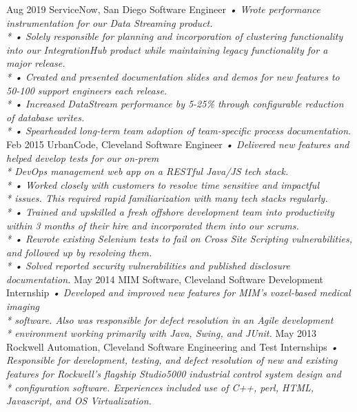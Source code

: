 \documentclass[]{friggeri-cv}
\begin{document}
\begin{entrylist}
  \entry
    {Aug 2019}
    {ServiceNow, San Diego}
    {Software Engineer}
    {\emph{
    •	Wrote performance instrumentation for our Data Streaming product.\\*
    •	Solely responsible for planning and incorporation of clustering functionality into our IntegrationHub product while maintaining legacy functionality for a major release.\\*
    •	Created and presented documentation slides and demos for new features to 50-100 support engineers each release.\\*
    •	Increased DataStream performance by 5-25\% through configurable reduction of database writes.\\*
    •	Spearheaded long-term team adoption of team-specific process documentation.}}
  \entry
    {Feb 2015}
    {UrbanCode, Cleveland}
    {Software Engineer}
    {\emph{
    •	Delivered new features and helped develop tests for our on-prem \\* DevOps management web app on a RESTful Java/JS tech stack.\\*
    •	Worked closely with customers to resolve time sensitive and impactful\\* issues. This required rapid familiarization with many tech stacks regularly.\\*
    •	Trained and upskilled a fresh offshore development team into productivity within 3 months of their hire and incorporated them into our scrums. \\*
    •	Rewrote existing Selenium tests to fail on Cross Site Scripting vulnerabilities, and followed up by resolving them.\\*
    •	Solved reported security vulnerabilities and published disclosure documentation.}}
  \entry
    {May 2014}
    {MIM Software, Cleveland}
    {Software Development Internship}
    {\emph{
    •	Developed and improved new features for MIM's voxel-based medical imaging\\*
    software. Also was responsible for defect resolution in an Agile development \\*
    environment working primarily with Java, Swing, and JUnit.}}
  \entry
    {May 2013}
    {Rockwell Automation, Cleveland}
    {Software Engineering and Test Internships}
    {\emph{
    •	Responsible for development, testing, and defect resolution of new and existing features for Rockwell’s flagship Studio5000 industrial control system design and \\*
    configuration software.  Experiences included use of C++, perl, HTML, Javascript, and OS Virtualization.}}
\end{entrylist}
\end{document}
